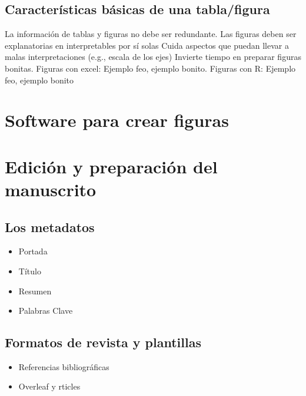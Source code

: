 \documentclass[
]{book}
\providecommand{\tightlist}{%
  \setlength{\itemsep}{0pt}\setlength{\parskip}{0pt}}
\begin{document}
\hypertarget{caracteruxedsticas-buxe1sicas-de-una-tablafigura}{%
\section{Características básicas de una tabla/figura}\label{caracteruxedsticas-buxe1sicas-de-una-tablafigura}}

La información de tablas y figuras no debe ser redundante.
Las figuras deben ser explanatorias en interpretables por sí solas
Cuida aspectos que puedan llevar a malas interpretaciones (e.g., escala de los ejes)
Invierte tiempo en preparar figuras bonitas.
Figuras con excel: Ejemplo feo, ejemplo bonito.
Figuras con R: Ejemplo feo, ejemplo bonito

\hypertarget{software-para-crear-figuras}{%
\chapter{Software para crear figuras}\label{software-para-crear-figuras}}

\hypertarget{ediciuxf3n-y-preparaciuxf3n-del-manuscrito}{%
\chapter{Edición y preparación del manuscrito}\label{ediciuxf3n-y-preparaciuxf3n-del-manuscrito}}

\hypertarget{los-metadatos}{%
\section{Los metadatos}\label{los-metadatos}}

\begin{itemize}
\tightlist
\item
  Portada
\item
  Título
\item
  Resumen
\item
  Palabras Clave
\end{itemize}

\hypertarget{formatos-de-revista-y-plantillas}{%
\section{Formatos de revista y plantillas}\label{formatos-de-revista-y-plantillas}}

\begin{itemize}
\tightlist
\item
  Referencias bibliográficas
\item
  Overleaf y rticles
\end{itemize}
\end{document}
